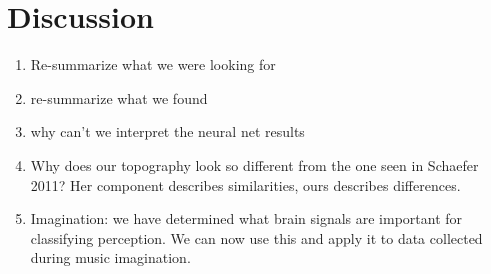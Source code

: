 \chapter*{Discussion}

\begin{enumerate}
\item Re-summarize what we were looking for
\item re-summarize what we found
\item why can't we interpret the neural net results
\item Why does our topography look so different from the one seen in Schaefer 2011? Her component describes similarities, ours describes differences. 
\item Imagination: we have determined what brain signals are important for classifying perception. We can now use this and apply it to data collected during music imagination.
\end{enumerate} 